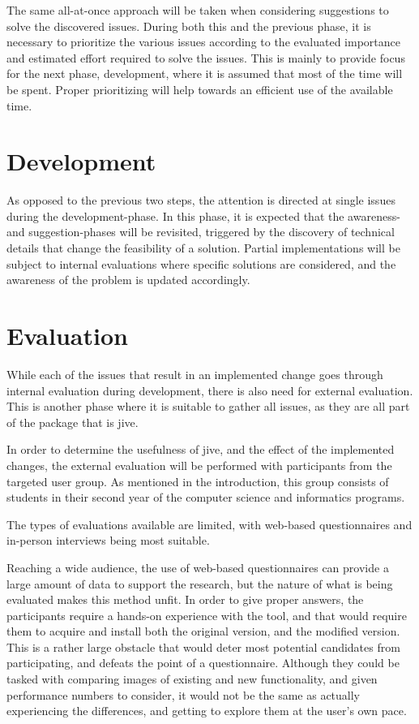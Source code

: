 The same all-at-once approach will be taken when considering suggestions to solve the discovered issues.
During both this and the previous phase, it is necessary to prioritize the various issues according to the evaluated importance and estimated effort required to solve the issues.
This is mainly to provide focus for the next phase, development, where it is assumed that most of the time will be spent.
Proper prioritizing will help towards an efficient use of the available time. 

\section{Development}\label{methDevelop}

As opposed to the previous two steps, the attention is directed at single issues during the development-phase.
In this phase, it is expected that the awareness- and suggestion-phases will be revisited, triggered by the discovery of technical details that change the feasibility of a solution.
Partial implementations will be subject to internal evaluations where specific solutions are considered, and the awareness of the problem is updated accordingly.

\section{Evaluation}\label{methEval}

While each of the issues that result in an implemented change goes through internal evaluation during development, there is also need for external evaluation.
This is another phase where it is suitable to gather all issues, as they are all part of the package that is \gls{jive}.

In order to determine the usefulness of \gls{jive}, and the effect of the implemented changes, the external evaluation will be performed with participants from the targeted user group.
As mentioned in the introduction, this group consists of students in their second year of the computer science and informatics programs.

The types of evaluations available are limited, with web-based questionnaires and in-person interviews being most suitable.

Reaching a wide audience, the use of web-based questionnaires can provide a large amount of data to support the research, but the nature of what is being evaluated makes this method unfit.
In order to give proper answers, the participants require a hands-on experience with the tool, and that would require them to acquire and install both the original version, and the modified version.
This is a rather large obstacle that would deter most potential candidates from participating, and defeats the point of a questionnaire.
Although they could be tasked with comparing images of existing and new functionality, and given performance numbers to consider, it would not be the same as actually experiencing the differences, and getting to explore them at the user's own pace.

